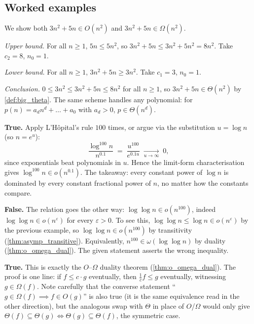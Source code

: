 \subsection{Worked examples}

\begin{example}
\label{ex:theta_polynomial}
We show both $3n^2 + 5n \in O(n^2)$ and $3n^2 + 5n \in \Omega(n^2)$.

\medskip
\noindent\textit{Upper bound.} For all $n \ge 1$, $5n \le 5n^2$, so $3n^2 + 5n \le 3n^2 + 5n^2 = 8n^2$. Take $c_2 = 8$, $n_0 = 1$.

\medskip
\noindent\textit{Lower bound.} For all $n \ge 1$, $3n^2 + 5n \ge 3n^2$. Take $c_1 = 3$, $n_0 = 1$.

\medskip
\noindent\textit{Conclusion.} $0 \le 3n^2 \le 3n^2 + 5n \le 8n^2$ for all $n \ge 1$, so $3n^2 + 5n \in \Theta(n^2)$ by \cref{def:big_theta}. The same scheme handles any polynomial: for $p(n) = a_d n^d + \ldots + a_0$ with $a_d > 0$, $p \in \Theta(n^d)$.
\end{example}

\begin{example}[$\log^{100} n \in o(n^{0.1})$]
\label{ex:logpow_vs_nfrac}
\textbf{True.} Apply L'H\^opital's rule $100$ times, or argue via the substitution $u = \log n$ (so $n = e^u$):
\[
  \frac{\log^{100} n}{n^{0.1}} \;=\; \frac{u^{100}}{e^{0.1 u}}
  \;\xrightarrow[u \to \infty]{}\; 0,
\]
since exponentials beat polynomials in $u$. Hence the limit-form characterisation gives $\log^{100} n \in o(n^{0.1})$. The takeaway: every constant power of $\log n$ is dominated by every constant fractional power of $n$, no matter how the constants compare.
\end{example}

\begin{example}
\label{ex:loglog_vs_npow}
\textbf{False.} The relation goes the other way: $\log\log n \in o(n^{100})$, indeed $\log\log n \in o(n^{\varepsilon})$ for every $\varepsilon > 0$. To see this, $\log\log n \le \log n \in o(n^{\varepsilon})$ by the previous example, so $\log\log n \in o(n^{100})$ by transitivity (\cref{thm:asymp_transitive}). Equivalently, $n^{100} \in \omega(\log\log n)$ by duality (\cref{thm:o_omega_dual}). The given statement asserts the wrong inequality.
\end{example}

\begin{example}
\label{ex:o_implies_omega}
\textbf{True.} This is exactly the $O$--$\Omega$ duality theorem (\cref{thm:o_omega_dual}). The proof is one line: if $f \le c \cdot g$ eventually, then $\frac{1}{c} f \le g$ eventually, witnessing $g \in \Omega(f)$. Note carefully that the converse statement ``$g \in \Omega(f) \implies f \in O(g)$'' is also true (it is the same equivalence read in the other direction), but the analogous swap with $\Theta$ in place of $O$/$\Omega$ would only give $\Theta(f) \subseteq \Theta(g) \iff \Theta(g) \subseteq \Theta(f)$, the symmetric case.
\end{example}

